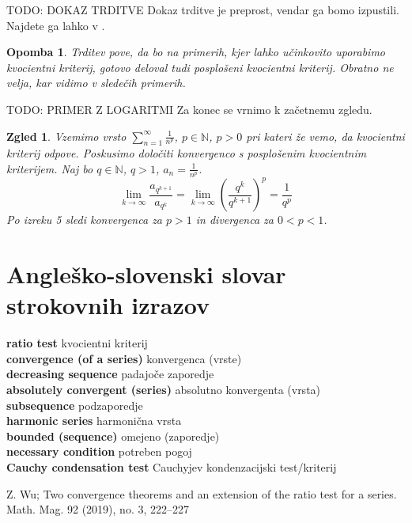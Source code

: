 \documentclass[a4paper,12pt]{article}
\def\N{\mathbb{N}} %
\newcommand{\geslo}[2]{\noindent\textbf{#1} \quad \hangindent=1cm #2\\[-1pc]}
\newtheorem{opomba}{Opomba}
\newtheorem{zgled}{Zgled}
\begin{document}
TODO: DOKAZ TRDITVE
Dokaz trditve je preprost, vendar ga bomo izpustili. Najdete ga lahko v \cite{convergence}.

\begin{opomba}
    Trditev pove, da bo na primerih, kjer lahko učinkovito uporabimo kvocientni kriterij,
    gotovo deloval tudi posplošeni kvocientni kriterij. Obratno ne velja, kar vidimo v sledečih primerih.
\end{opomba}

TODO: PRIMER Z LOGARITMI
\noindent
Za konec se vrnimo k začetnemu zgledu.
\begin{zgled}
    Vzemimo vrsto $\sum_{n = 1}^{\infty}{\frac{1}{n^p}}$, $p \in \N$, $p > 0$ pri kateri
    že vemo, da kvocientni kriterij odpove. Poskusimo določiti konvergenco s posplošenim kvocientnim kriterijem.
    Naj bo $q \in \N$, $q > 1$, $a_n = \frac{1}{n^p}$.
    \[
            \lim_{k \to \infty}{\frac{a_{q^{k + 1}}}{a_{q^k}}} =
            \lim_{k \to \infty}{(\frac{q^k}{q^{k+1}})^p} = \frac{1}{q^p}
    \]
    Po izreku 5 sledi konvergenca za $p>1$ in divergenca za $ 0< p<1$.
\end{zgled}

\section{Angleško-slovenski slovar strokovnih izrazov}

\geslo{ratio test}{kvocientni kriterij}

\geslo{convergence (of a series)}{konvergenca (vrste)}

\geslo{decreasing sequence}{padajoče zaporedje}

\geslo{absolutely convergent (series)}{absolutno konvergenta (vrsta)}

\geslo{subsequence}{podzaporedje}

\geslo{harmonic series}{harmonična vrsta}

\geslo{bounded (sequence)}{omejeno (zaporedje)}

\geslo{necessary condition}{potreben pogoj}

\geslo{Cauchy condensation test}{Cauchyjev kondenzacijski test/kriterij}



















\begin{thebibliography}{1}
    Z. Wu; Two convergence theorems and an extension of the ratio test for a
    series. Math. Mag. 92 (2019), no. 3, 222–227
\end{thebibliography}

\end{document}

